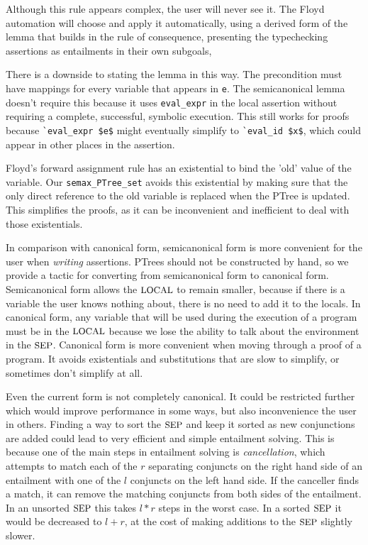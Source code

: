 \documentclass{puthesis}
\begin{document}
Although this rule appears complex, the user will never see it. The
Floyd automation will choose and apply it automatically, using a
derived form of the lemma that builds in the rule of consequence,
presenting the typechecking assertions as entailments in their own
subgoals, 

There is a downside to stating the lemma in this way. The precondition
must have mappings for every variable that appears in \lstinline|e|. The
semicanonical lemma doesn't require this because it uses
\lstinline|eval_expr| in the local assertion without requiring a
complete, successful, symbolic execution. This still works for proofs
because \lstinline|`eval_expr $e$| might eventually simplify to
\lstinline|`eval_id $x$|, which could appear in other places in the
assertion.

Floyd's forward assignment rule has an existential to bind the 'old'
value of the variable.  Our \lstinline|semax_PTree_set| avoids this
existential by making sure that the only direct reference to the old
variable is replaced when the PTree is updated.  This simplifies the
proofs, as it can be inconvenient and inefficient to deal with those
existentials.

In comparison with canonical form, semicanonical form is more
convenient for the user when \emph{writing} assertions. PTrees should
not be constructed by hand, so we provide a tactic for converting from
semicanonical form to canonical form. Semicanonical form allows the
$\mbox{\small LOCAL}$ to remain smaller, because if there is a variable the user
knows nothing about, there is no need to add it to the locals. In
canonical form, any variable that will be used during the execution of
a program must be in the $\mbox{\small LOCAL}$ because we lose the ability to talk
about the environment in the $\mbox{\small SEP}$. Canonical form is
more convenient when moving through a proof of a program. It avoids
existentials and substitutions that are slow to simplify, or
sometimes don't simplify at all. 

Even the current form is not completely canonical. It could be
restricted further which would improve performance in some ways, but
also inconvenience the user in others. Finding a way to sort the
$\mbox{\small SEP}$ and keep it sorted as new conjunctions are added could lead to
very efficient and simple entailment solving. This is because one of
the main steps in entailment solving is \emph{cancellation}, which
attempts to match
each of the $r$ separating conjuncts on the right hand side of an
entailment with one of the $l$ conjuncts on the left hand side. If the
canceller finds a match, it can remove the matching conjuncts from
both sides of the entailment. In an unsorted $\mbox{\small SEP}$ this takes $l * r$
steps in the worst case. In a sorted $\mbox{\small SEP}$ it would be decreased to
$l + r$, at the cost of making additions to the $\mbox{\small SEP}$ slightly
slower. 
\end{document}
